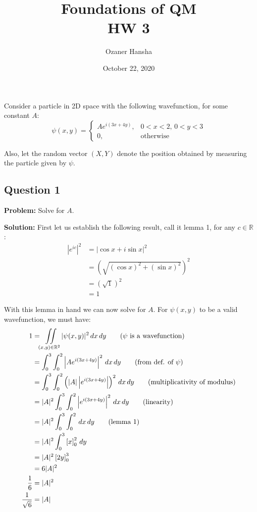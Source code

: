 \documentclass{article}
\newcommand*\eval[3]{\left[#1\right]_{#2}^{#3}}
\begin{document}
\title{Foundations of QM\\ HW 3}
\author{Ozaner Hansha}
\date{October 22, 2020}
\maketitle

Consider a particle in 2D space with the following wavefunction, for some constant $A$:
$$\psi(x,y)=\begin{cases}
    Ae^{i(3x+4y)},&0<x<2,\,0<y<3\\
    0,&\text{otherwise}
\end{cases}$$

Also, let the random vector $(X,Y)$ denote the position obtained by measuring the particle given by $\psi$.

\subsection*{Question 1}
\noindent\textbf{Problem:} Solve for $A$.
\bigskip

\noindent\textbf{Solution:} First let us establish the following result, call it lemma 1, for any $c\in\mathbb R$:
\begin{align*}
    |e^{ic}|^2&=|\cos x+i\sin x|^2\tag{Euler's formula}\\
    &=\left(\sqrt{(\cos x)^2+(\sin x)^2}\right)^2\tag{def. of modulus}\\
    &=\left(\sqrt{1}\right)^2\tag{trig identity}\\
    &=1
\end{align*}

With this lemma in hand we can now solve for $A$. For $\psi(x,y)$ to be a valid wavefunction, we must have:
\begin{align*}
    1&=\iint\displaylimits_{(x,y)\in\mathbb R^2}|\psi(x,y)|^2\,dx\,dy\tag{$\psi$ is a wavefunction}\\
    &=\int_0^3\int_0^2\left|Ae^{i(3x+4y)}\right|^2\,dx\,dy\tag{from def. of $\psi$}\\
    &=\int_0^3\int_0^2\left(|A|\left|e^{i(3x+4y)}\right|\right)^2\,dx\,dy\tag{multiplicativity of modulus}\\
    &=|A|^2\int_0^3\int_0^2\left|e^{i(3x+4y)}\right|^2\,dx\,dy\tag{linearity}\\
    &=|A|^2\int_0^3\int_0^2\,dx\,dy\tag{lemma 1}\\
    &=|A|^2\int_0^3\eval{x}{0}{2}\,dy\\
    &=|A|^2\eval{2y}{0}{3}\\
    &=6|A|^2\\
    \frac{1}{6}&=|A|^2\\
    \frac{1}{\sqrt 6}&=|A|
\end{align*}
\end{document}
